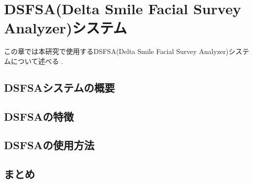 \chapter{DSFSA(Delta Smile Facial Survey Analyzer)システム}
\label{chap:aboutDSFSA}

この章では本研究で使用するDSFSA(Delta Smile Facial Survey Analyzer)システムについて述べる .

\section{DSFSAシステムの概要}
\section{DSFSAの特徴}
\section{DSFSAの使用方法}
\section{まとめ}
